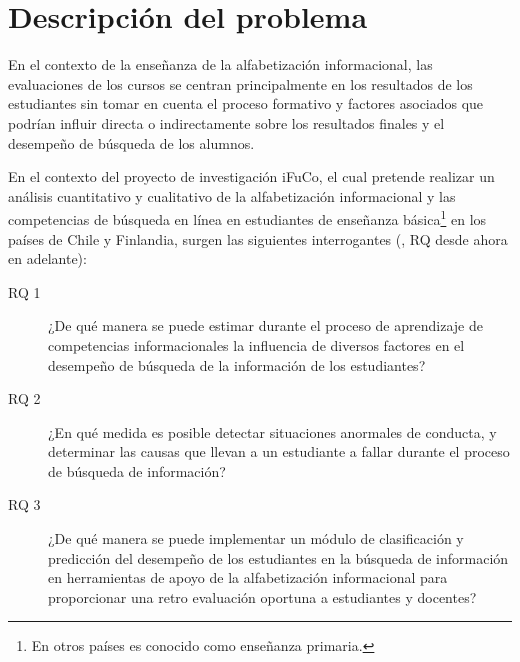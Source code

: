 \section{Descripción del problema}
\label{sec:descripcion-problema}
En el contexto de la enseñanza de la alfabetización informacional, las evaluaciones de los cursos se centran principalmente en los resultados de los estudiantes sin tomar en cuenta el proceso formativo y factores asociados que podrían influir directa o indirectamente sobre los resultados finales y el desempeño de búsqueda de los alumnos.  

En el contexto del proyecto de investigación iFuCo, el cual pretende realizar un análisis cuantitativo y cualitativo de la alfabetización informacional y las competencias de búsqueda en línea en estudiantes de enseñanza básica\footnote{En otros países es conocido como enseñanza primaria.} en los países de Chile y Finlandia, surgen las siguientes interrogantes (, RQ desde ahora en adelante):

\begin{description}
	\item [RQ 1] ¿De qué manera se puede estimar durante el proceso de aprendizaje de competencias informacionales la influencia de diversos factores en el desempeño de búsqueda de la información de los estudiantes?
	\item [RQ 2] ¿En qué medida es posible detectar situaciones anormales de conducta, y determinar las causas que llevan a un estudiante a fallar durante el proceso de búsqueda de información? 
	\item [RQ 3] ¿De qué manera se puede implementar un módulo de clasificación y predicción del desempeño de los estudiantes en la búsqueda de información en herramientas de apoyo de la alfabetización informacional para proporcionar una retro evaluación oportuna a estudiantes y docentes?
\end{description}